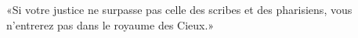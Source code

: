 \encetemps \jesusdisciples
	«Si votre justice ne surpasse pas celle des scribes et des pharisiens,
	vous n’entrerez pas dans le royaume des Cieux.»
